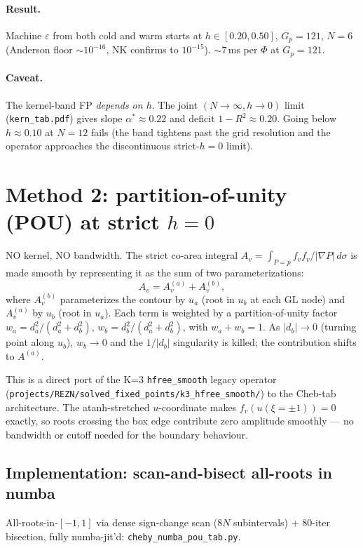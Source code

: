 \documentclass[11pt]{article}
\begin{document}
\paragraph{Result.} Machine $\varepsilon$ from both cold and warm starts
at $h \in [0.20, 0.50]$, $G_p{=}121$, $N{=}6$ (Anderson floor
$\sim 10^{-16}$, NK confirms to $10^{-15}$). $\sim 7$\,ms per $\Phi$ at
$G_p{=}121$.

\paragraph{Caveat.} The kernel-band FP \emph{depends on $h$}. The joint
$(N{\to}\infty, h{\to}0)$ limit (\texttt{kern\_tab.pdf}) gives slope
$\alpha^* \approx 0.22$ and deficit $1{-}R^2 \approx 0.20$. Going below
$h \approx 0.10$ at $N{=}12$ fails (the band tightens past the grid
resolution and the operator approaches the discontinuous strict-$h{=}0$
limit).

\section{Method 2: partition-of-unity (POU) at strict $h=0$}

NO kernel, NO bandwidth. The strict co-area integral
$A_v = \int_{P=p} f_v f_v / |\nabla P|\, d\sigma$ is made smooth by
representing it as the sum of two parameterizations:
\[
   A_v = A_v^{(a)} + A_v^{(b)},
\]
where $A_v^{(b)}$ parameterizes the contour by $u_a$ (root in $u_b$
at each GL node) and $A_v^{(a)}$ by $u_b$ (root in $u_a$). Each term is
weighted by a partition-of-unity factor
$w_a = d_a^2 / (d_a^2 + d_b^2)$, $w_b = d_b^2 / (d_a^2 + d_b^2)$, with
$w_a + w_b = 1$. As $|d_b| \to 0$ (turning point along $u_b$), $w_b \to 0$
and the $1/|d_b|$ singularity is killed; the contribution shifts to
$A^{(a)}$.

This is a direct port of the K=3 \texttt{hfree\_smooth} legacy operator
(\texttt{projects/REZN/solved\_fixed\_points/k3\_hfree\_smooth/}) to
the Cheb-tab architecture. The atanh-stretched $u$-coordinate makes
$f_v(u(\xi{=}\pm 1)) = 0$ exactly, so roots crossing the box edge
contribute zero amplitude smoothly --- no bandwidth or cutoff needed
for the boundary behaviour.

\subsection{Implementation: scan-and-bisect all-roots in numba}

All-roots-in-$[-1,1]$ via dense sign-change scan
($8N$ subintervals) + 80-iter bisection, fully numba-jit'd:
\texttt{cheby\_numba\_pou\_tab.py}.
\end{document}
